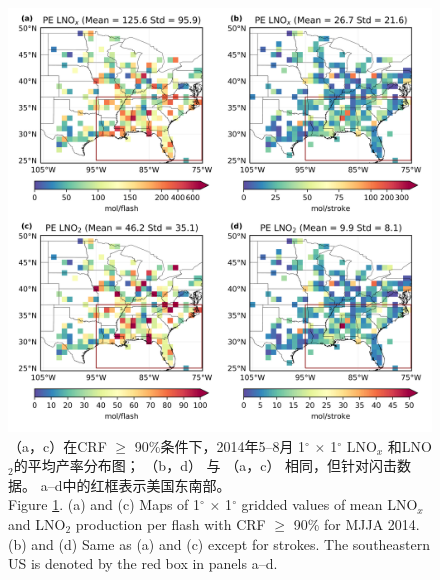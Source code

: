 \begin{figure}[!htbp]
\centering
\includegraphics[width=13cm]{./figures/us_pe_sum.png}
\caption{（a，c）在CRF $\geq$ 90\%条件下，2014年5--8月 1$^{\circ}$ $\times$ 1$^{\circ}$ LNO$_x$ 和LNO$_2$的平均产率分布图；
     （b，d） 与 （a，c） 相同，但针对闪击数据。
     a--d中的红框表示美国东南部。\\
     Figure \ref{fig:us_pe_sum}. (a) and (c) Maps of 1$^{\circ}$ $\times$ 1$^{\circ}$ gridded values of mean LNO$_x$
    and LNO$_2$ production per flash with CRF $\geq$ 90\% for MJJA 2014.
    (b) and (d) Same as (a) and (c) except for strokes.
    The southeastern US is denoted by the red box in panels a--d.
}
\label{fig:us_pe_sum}
\end{figure}

